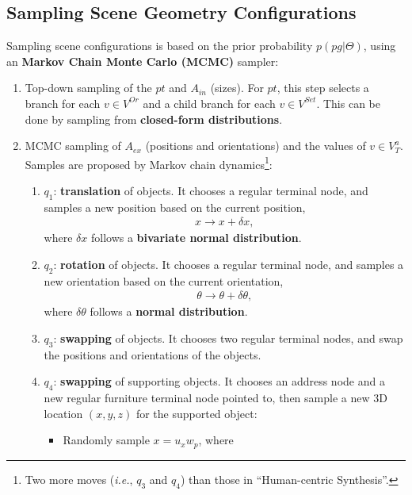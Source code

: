 \documentclass[10pt]{article}
\newcommand{\Ie}{\textit{i.e.}}
\begin{document}
\subsection{Sampling Scene Geometry Configurations}%
\label{sec:sampling}
Sampling scene configurations is based on the prior probability
$p(pg \vert \Theta)$, using an \textbf{Markov Chain Monte Carlo (MCMC)}
sampler:
%
\begin{enumerate}
  \item Top-down sampling of the $pt$ and $A_{in}$ (sizes). For $pt$, this step
    selects a branch for each $v \in V^{Or}$ and a child branch for each
    $v \in V^{Set}$. This can be done by sampling from \textbf{closed-form
    distributions}.
  \item MCMC sampling of $A_{ex}$ (positions and orientations) and the values
    of $v \in V^a_T$. Samples are proposed by Markov chain dynamics\footnote{%
    Two more moves (\Ie, $q_3$ and $q_4$) than those in ``Human-centric
    Synthesis''.}:
    \begin{enumerate}
      \item $q_1$: \textbf{translation} of objects. It chooses a regular
        terminal node, and samples a new position based on the current
        position,
        \begin{align}
          \label{eq:32}
          x \rightarrow x + \delta x,
        \end{align}
        where $\delta x$ follows a \textbf{bivariate normal distribution}.
      \item $q_2$: \textbf{rotation} of objects. It chooses a regular terminal
        node, and samples a new orientation based on the current orientation,
        \begin{align}
          \label{eq:33}
          \theta \rightarrow \theta + \delta \theta,
        \end{align}
        where $\delta \theta$ follows a \textbf{normal distribution}.
      \item $q_3$: \textbf{swapping} of objects. It chooses two regular
        terminal nodes, and swap the positions and orientations of the objects.
      \item $q_4$: \textbf{swapping} of supporting objects. It chooses an
        address node and a new regular furniture terminal node pointed to, then
        sample a new 3D location $(x, y, z)$ for the supported object:
        \begin{itemize}
          \item Randomly sample $x = u_x w_p$, where

\end{itemize}
\end{enumerate}
\end{enumerate}
\end{document}
